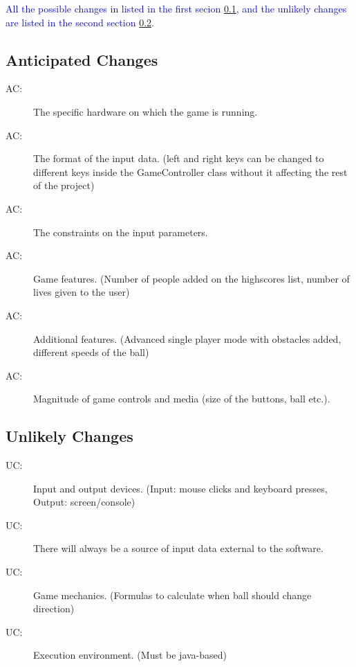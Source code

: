 \documentclass[12pt,letterpaper]{article}
\newcounter{acnum}
\newcommand{\actheacnum}{AC\theacnum}
\newcounter{ucnum}
\newcommand{\uctheucnum}{UC\theucnum}
\begin{document}
	\textcolor{blue}{All the possible changes in listed in the first secion \ref{SecAchange}, and the unlikely changes are listed in the second section \ref{SecUchange}.}	

	\subsection{Anticipated Changes} \label{SecAchange}
	\begin{description}
	\item[ \actheacnum \label{acHardware}:]	The specific hardware on which the game is running.
	\item[ \actheacnum \label{acInput}:]	The format of the input data. (left and right keys can be changed to different keys inside the GameController class without it affecting the rest of the project)
	\item[ \actheacnum \label{acConstraint}:]	The constraints on the input parameters.
	\item[ \actheacnum \label{acFeatures}:]	Game features. (Number of people added on the highscores list, number of lives given to the user)
	\item[ \actheacnum \label{acMode}:]	Additional features. (Advanced single player mode with obstacles added, different speeds of the ball)
	\item[ \actheacnum \label{acMag}:]	Magnitude of game controls and media (size of the buttons, ball etc.).
	\end{description}	

	\subsection{Unlikely Changes} \label{SecUchange}
	\begin{description}
	\item[ \uctheucnum \label{ucIO}:]	Input and output devices. (Input: mouse clicks and keyboard presses, Output: screen/console)
	\item[ \uctheucnum \label{ucInput}:]	There will always be a source of input data external to the software.
	\item[ \uctheucnum \label{ucMech}:]	Game mechanics. (Formulas to calculate when ball should change direction) 
	\item[ \uctheucnum \label{ucEnv}:]	Execution environment. (Must be java-based)
	\end{description}
\end{document}
